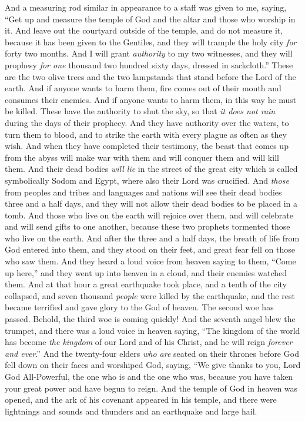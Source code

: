 \begin{biblechapter} %
 And a measuring rod similar in appearance to a staff was given to me, saying, “Get up and measure the temple of God and the altar and those who worship in it.
\verse And leave out the courtyard outside of the temple, and do not measure it, because it has been given to the Gentiles, and they will trample the holy city \textit{for} forty two months.
\verse And I will grant \textit{authority} to my two witnesses, and they will prophesy \textit{for one} thousand two hundred sixty days, dressed in sackcloth.”
\verse These are the two olive trees and the two lampstands that stand before the Lord of the earth.
\verse And if anyone wants to harm them, fire comes out of their mouth and consumes their enemies. And if anyone wants to harm them, in this way he must be killed.
\verse These have the authority to shut the sky, so that \textit{it does not rain} during the days of their prophecy. And they have authority over the waters, to turn them to blood, and to strike the earth with every plague as often as they wish.
\verse And when they have completed their testimony, the beast that comes up from the abyss will make war with them and will conquer them and will kill them.
\verse And their dead bodies \textit{will lie} in the street of the great city which is called symbolically Sodom and Egypt, where also their Lord was crucified.
\verse And \textit{those} from peoples and tribes and languages and nations will see their dead bodies three and a half days, and they will not allow their dead bodies to be placed in a tomb.
\verse And those who live on the earth will rejoice over them, and will celebrate and will send gifts to one another, because these two prophets tormented those who live on the earth.
\verse And after the three and a half days, the breath of life from God entered into them, and they stood on their feet, and great fear fell on those who saw them.
\verse And they heard a loud voice from heaven saying to them, “Come up here,” and they went up into heaven in a cloud, and their enemies watched them.
\verse And at that hour a great earthquake took place, and a tenth of the city collapsed, and seven thousand \textit{people} were killed by the earthquake, and the rest became terrified and gave glory to the God of heaven.
\verse The second woe has passed. Behold, the third woe is coming quickly!
 And the seventh angel blew the trumpet, and there was a loud voice in heaven saying, “The kingdom of the world has become \textit{the kingdom} of our Lord 
and of his Christ, 
and he will reign \textit{forever and ever}.”
\verse And the twenty-four elders \textit{who are} seated on their thrones before God fell down on their faces and worshiped God,
\verse saying,
\verse “We give thanks to you, Lord God All-Powerful, 
the one who is and the one who was, 
because you have taken your great power 
and have begun to reign.
\verse And the temple of God in heaven was opened, and the ark of his covenant appeared in his temple, and there were lightnings and sounds and thunders and an earthquake and large hail.
\end{biblechapter}

